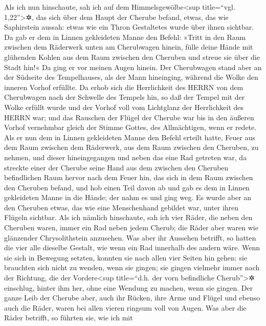Als ich nun hinschaute, sah ich auf dem
Himmelsgewölbe\textless sup title=``vgl. 1,22''\textgreater✲, das sich
über dem Haupt der Cherube befand, etwas, das wie Saphirstein aussah:
etwas wie ein Thron Gestaltetes wurde über ihnen sichtbar.
Da gab er dem in Linnen gekleideten Manne den Befehl:
»Tritt in den Raum zwischen dem Räderwerk unten am Cherubwagen hinein,
fülle deine Hände mit glühenden Kohlen aus dem Raum zwischen den
Cheruben und streue sie über die Stadt hin!« Da ging er vor meinen Augen
hinein. Der Cherubwagen stand aber an der Südseite des
Tempelhauses, als der Mann hineinging, während die Wolke den inneren
Vorhof erfüllte. Da erhob sich die Herrlichkeit des HERRN
von dem Cherubwagen nach der Schwelle des Tempels hin, so daß der Tempel
mit der Wolke erfüllt wurde und der Vorhof voll vom Lichtglanz der
Herrlichkeit des HERRN war; und das Rauschen der Flügel
der Cherube war bis in den äußeren Vorhof vernehmbar gleich der Stimme
Gottes, des Allmächtigen, wenn er redete. Als er nun dem
in Linnen gekleideten Manne den Befehl erteilt hatte, Feuer aus dem Raum
zwischen dem Räderwerk, aus dem Raum zwischen den Cheruben, zu nehmen,
und dieser hineingegangen und neben das eine Rad getreten war,
da streckte einer der Cherube seine Hand aus dem zwischen
den Cheruben befindlichen Raum hervor nach dem Feuer hin, das sich in
dem Raum zwischen den Cheruben befand, und hob einen Teil davon ab und
gab es dem in Linnen gekleideten Manne in die Hände; der nahm es und
ging weg. \bibleverse{8}{[}Es wurde aber an den Cheruben etwas, das wie
eine Menschenhand gebildet war, unter ihren Flügeln sichtbar.
Als ich nämlich hinschaute, sah ich vier Räder, die neben
den Cheruben waren, immer ein Rad neben jedem Cherub; die Räder aber
waren wie glänzender Chrysolithstein anzusehen. Was aber
ihr Aussehen betrifft, so hatten die vier alle dieselbe Gestalt, wie
wenn ein Rad innerhalb des andern wäre. Wenn sie sich in
Bewegung setzten, konnten sie nach allen vier Seiten hin gehen: sie
brauchten sich nicht zu wenden, wenn sie gingen; sie gingen vielmehr
immer nach der Richtung, die der Vordere\textless sup title=``d.h. der
vorn befindliche Cherub''\textgreater✲ einschlug, hinter ihm her, ohne
eine Wendung zu machen, wenn sie gingen. Der ganze Leib
der Cherube aber, auch ihr Rücken, ihre Arme und Flügel und ebenso auch
die Räder, waren bei allen vieren ringsum voll von Augen.
Was aber die Räder betrifft, so führten sie, wie ich mit
